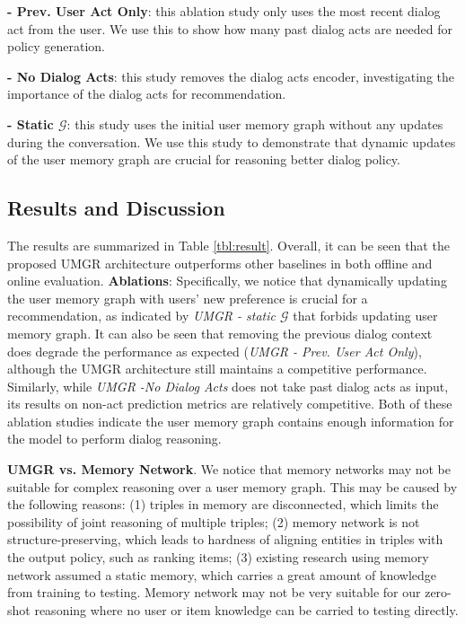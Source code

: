 \documentclass[11pt,a4paper]{article}
\begin{document}
\noindent \textbf{- Prev. User Act Only}: this ablation study only uses the most recent dialog act from the user. We use this to show how many past dialog acts are needed for policy generation.

\noindent \textbf{- No Dialog Acts}: this study removes the dialog acts encoder, investigating the importance of the dialog acts for recommendation.

\noindent \textbf{- Static $\mathcal{G}$}: this study uses the initial user memory graph without any updates during the conversation. We use this study to demonstrate that dynamic updates of the user memory graph are crucial for reasoning better dialog policy.

\subsection{Results and Discussion}
The results are summarized in Table \ref{tbl:result}.
Overall, it can be seen that the proposed UMGR architecture outperforms other baselines in both offline and online evaluation.
\textbf{Ablations}: Specifically, we notice that dynamically updating the user memory graph with users' new preference is crucial for a recommendation, as indicated by \textit{UMGR - static $\mathcal{G}$} that forbids updating user memory graph. 
It can also be seen that removing the previous dialog context does degrade the performance as expected (\textit{UMGR - Prev. User Act Only}), although the UMGR architecture still maintains a competitive performance. 
Similarly, while \textit{UMGR -No Dialog Acts} does not take past dialog acts as input, its results on non-act prediction metrics are relatively competitive.
Both of these ablation studies indicate the user memory graph contains enough information for the model to perform dialog reasoning.

\noindent \textbf{UMGR vs. Memory Network}. We notice that memory networks may not be suitable for complex reasoning over a user memory graph. This may be caused by the following reasons: (1) triples in memory are disconnected, which limits the possibility of joint reasoning of multiple triples; (2) memory network is not structure-preserving, which leads to hardness of aligning entities in triples with the output policy, such as ranking items; (3) existing research using memory network \cite{bordes2016learning,eric2017key,madotto2018mem2seq} assumed a static memory, which carries a great amount of knowledge from training to testing. Memory network may not be very suitable for our zero-shot reasoning where no user or item knowledge can be carried to testing directly.
\end{document}
